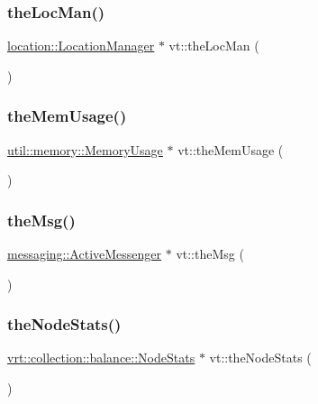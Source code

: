 \mbox{\label{namespacevt_ace1c9d64e09732e3b7414d02517ecfdb}} 
\subsubsection{\texorpdfstring{the\+Loc\+Man()}{theLocMan()}}
{\footnotesize\ttfamily \hyperlink{structvt_1_1location_1_1_location_manager}{location\+::\+Location\+Manager} $\ast$ vt\+::the\+Loc\+Man (\begin{DoxyParamCaption}{ }\end{DoxyParamCaption})}

\mbox{\label{namespacevt_a38d485d3cf840b9a623e47e7754ef72e}} 
\subsubsection{\texorpdfstring{the\+Mem\+Usage()}{theMemUsage()}}
{\footnotesize\ttfamily \hyperlink{structvt_1_1util_1_1memory_1_1_memory_usage}{util\+::memory\+::\+Memory\+Usage} $\ast$ vt\+::the\+Mem\+Usage (\begin{DoxyParamCaption}{ }\end{DoxyParamCaption})}

\mbox{\label{namespacevt_aeafd31f866aeb4dc6fc2f6ee97136350}} 
\subsubsection{\texorpdfstring{the\+Msg()}{theMsg()}}
{\footnotesize\ttfamily \hyperlink{structvt_1_1messaging_1_1_active_messenger}{messaging\+::\+Active\+Messenger} $\ast$ vt\+::the\+Msg (\begin{DoxyParamCaption}{ }\end{DoxyParamCaption})}

\mbox{\label{namespacevt_ae1526efa346612ad330d9a628e596c54}} 
\subsubsection{\texorpdfstring{the\+Node\+Stats()}{theNodeStats()}}
{\footnotesize\ttfamily \hyperlink{structvt_1_1vrt_1_1collection_1_1balance_1_1_node_stats}{vrt\+::collection\+::balance\+::\+Node\+Stats} $\ast$ vt\+::the\+Node\+Stats (\begin{DoxyParamCaption}{ }\end{DoxyParamCaption})}

